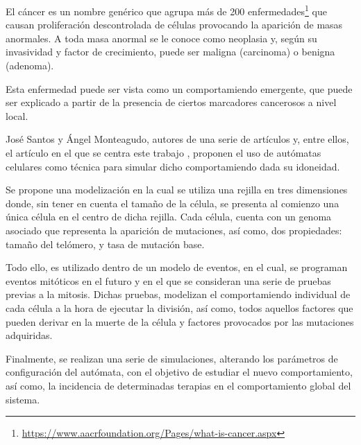 El cáncer es un nombre genérico que agrupa más de 200 enfermedades\footnote{\url{https://www.aacrfoundation.org/Pages/what-is-cancer.aspx}}
que causan proliferación descontrolada de células provocando la aparición de masas anormales. A toda masa anormal se
le conoce como neoplasia y, según su invasividad y factor de crecimiento, puede ser maligna (carcinoma) o benigna (adenoma).

Esta enfermedad puede ser vista como un comportamiendo emergente, que puede ser explicado a
partir de la presencia de ciertos marcadores cancerosos a nivel local.

José Santos y Ángel Monteagudo, autores de una serie de artículos \cite{jsantos-amonteagudo-2012} \cite{jsantos-amonteagudo-2013} \cite{jsantos-amonteagudo-2015} y, entre ellos, el artículo
en el que se centra este trabajo \cite{jsantos-amonteagudo-1-2014}, proponen el uso de autómatas
celulares como técnica para simular dicho comportamiendo dada su idoneidad.

Se propone una modelización en la cual se utiliza una rejilla en tres dimensiones donde, sin
tener en cuenta el tamaño de la célula, se presenta al comienzo una única célula en el centro de dicha
rejilla. Cada célula, cuenta con un genoma asociado que representa la aparición de mutaciones,
así como, dos propiedades: tamaño del telómero, y tasa de mutación base.

Todo ello, es utilizado dentro de un modelo de eventos, en el cual, se programan eventos mitóticos
en el futuro y en el que se consideran una serie de pruebas previas a la mitosis. Dichas pruebas,
modelizan el comportamiendo individual de cada célula a la hora de ejecutar la división, así como,
todos aquellos factores que pueden derivar en la muerte de la célula y factores provocados
por las mutaciones adquiridas.

Finalmente, se realizan una serie de simulaciones, alterando los parámetros de configuración del
autómata, con el objetivo de estudiar el nuevo comportamiento, así como, la incidencia
de determinadas terapias en el comportamiento global del sistema.
